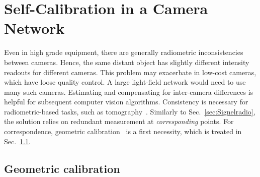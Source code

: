 \documentclass[runningheads]{llncs}
\begin{document}
\section{Self-Calibration in a Camera Network}
\label{sec:muticalib}

Even in high grade equipment, there are generally radiometric inconsistencies between cameras. Hence, the same distant object has slightly different intensity readouts for different cameras. This problem may exacerbate in low-cost cameras, which have loose quality control. A large light-field network would need to use many such cameras. Estimating and compensating for inter-camera differences is helpful for subsequent computer vision algorithms. Consistency is necessary for radiometric-based tasks, such as tomography~\cite{Aides:13}.
 Similarly to Sec.~\ref{sec:Signelradio}, the solution relies on redundant measurement at {\em corresponding} points.   For correspondence, geometric calibration~\cite{Seiz2002} is a first necessity, which is treated in Sec.~\ref{sec:geometry}.


\subsection{Geometric calibration}
\label{sec:geometry}
\end{document}
